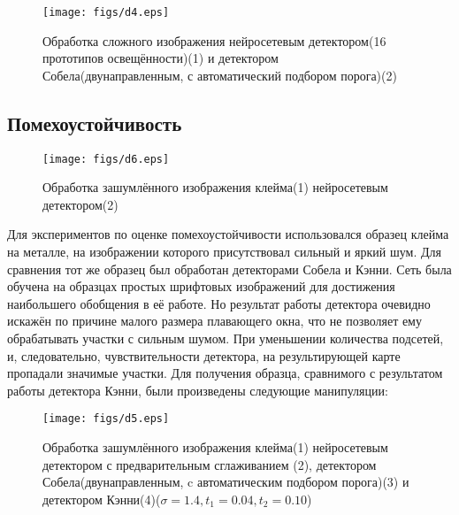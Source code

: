 \documentclass[a4paper,12pt]{report}
\begin{document}
\begin{center}
\begin{figure}[h]
\begin{center}
\texttt{[image: figs/d4.eps]}
\end{center}\caption{Обработка сложного изображения нейросетевым детектором(16 прототипов освещённости)(1) и детектором Собела(двунаправленным, с автоматический подбором порога)(2)}
\label{weirdsobel}
\end{figure}
\end{center}
\subsection{Помехоустойчивость}
\begin{center}
\begin{figure}[h]
\begin{center}
\texttt{[image: figs/d6.eps]}
\end{center}\caption{Обработка зашумлённого изображения клейма(1) нейросетевым детектором(2)}
\label{mksbad}
\end{figure}
\end{center}
Для экспериментов по оценке помехоустойчивости использовался образец клейма на металле, на изображении которого присутствовал сильный и яркий шум. Для сравнения тот же образец был обработан детекторами Собела и Кэнни. Сеть была обучена на образцах простых шрифтовых изображений для достижения наибольшего обобщения в её работе. Но результат работы детектора очевидно искажён по причине малого размера плавающего окна, что не позволяет ему обрабатывать участки с сильным шумом. При уменьшении количества подсетей, и, следовательно, чувствительности детектора, на результирующей карте пропадали значимые участки. Для получения образца, сравнимого с результатом работы детектора Кэнни, были произведены следующие манипуляции:
\begin{center}
\begin{figure}[h]
\begin{center}
\texttt{[image: figs/d5.eps]}
\end{center}\caption{Обработка зашумлённого изображения клейма(1) нейросетевым детектором с предварительным сглаживанием (2), детектором Собела(двунаправленным, c автоматическим подбором порога)(3) и детектором Кэнни(4)($\sigma=1.4, t_1=0.04, t_2=0.10$) }
\label{mks}
\end{figure}
\end{center}
\end{document}
